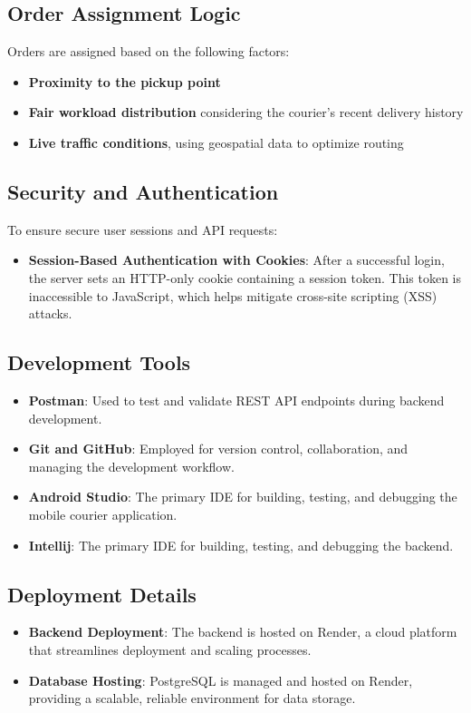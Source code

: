 \subsection{Order Assignment Logic}

Orders are assigned based on the following factors:
\begin{itemize}
    \item \textbf{Proximity to the pickup point}
    \item \textbf{Fair workload distribution} considering the courier’s recent delivery history
    \item \textbf{Live traffic conditions}, using geospatial data to optimize routing
\end{itemize}

\subsection{Security and Authentication}

To ensure secure user sessions and API requests:
\begin{itemize}
    \item \textbf{Session-Based Authentication with Cookies}: After a successful login, the server sets an HTTP-only cookie containing a session token. This token is inaccessible to JavaScript, which helps mitigate cross-site scripting (XSS) attacks.
\end{itemize}

\subsection{Development Tools}

\begin{itemize}
    \item \textbf{Postman}: Used to test and validate REST API endpoints during backend development.
    \item \textbf{Git and GitHub}: Employed for version control, collaboration, and managing the development workflow.
    \item \textbf{Android Studio}: The primary IDE for building, testing, and debugging the mobile courier application.
    \item \textbf{Intellij}: The primary IDE for building, testing, and debugging the backend.
\end{itemize}

\subsection{Deployment Details}

\begin{itemize}
    \item \textbf{Backend Deployment}: The backend is hosted on Render, a cloud platform that streamlines deployment and scaling processes.
    \item \textbf{Database Hosting}: PostgreSQL is managed and hosted on Render, providing a scalable, reliable environment for data storage.
\end{itemize}
